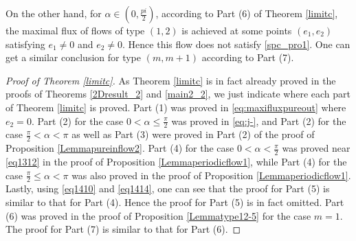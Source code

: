 \documentclass[reqno,12pt]{amsart}
\begin{document}
{
On the other hand, for $\alpha \in (0, \frac{pi}{2})$,  according to Part (6) of Theorem \ref{limitc}, the maximal flux of flows of type $(1,2)$ is achieved at some points $(e_1,e_2)$ satisfying $e_1 \not=0$ and $e_2\not =0$. Hence this flow does not satisfy \eqref{spc_pro1}. One can get a similar conclusion for type $(m,m+1)$ according to Part (7).
}

\begin{proof}[Proof of Theorem \ref{limitc}]
As Theorem \ref{limitc} is in fact already proved in the proofs of  Theorems \ref{2Dresult_2} and \ref{main2_2}, we just indicate where each part of Theorem \ref{limitc} is proved. Part (1) was proved in \eqref{eq:maxifluxpureout} where $e_2=0$.
Part (2) for the case $0<\alpha \leq \frac{\pi}{2}$ was proved in \eqref{eq:j-}, and Part (2) for the case $\frac{\pi}{2}<\alpha<\pi$ as well as Part (3) were proved in Part (2) of the proof of Proposition \ref{Lemmapureinflow2}. Part (4) for the case $0<\alpha< \frac{\pi}{2}$ was proved near \eqref{eq1312} in  the proof of Proposition \ref{Lemmaperiodicflow1}, while Part (4) for the case $\frac{\pi}{2}\leq \alpha < \pi$ was also proved in the proof of Proposition \ref{Lemmaperiodicflow1}. Lastly, using \eqref{eq1410} and \eqref{eq1414}, one can see that the proof for Part (5) is similar to that for Part (4). Hence the proof for Part (5) is in fact omitted. Part (6) was proved in the proof  of Proposition \ref{Lemmatype12-5} for the case $m=1$. The proof for  Part (7) is similar to that for Part (6).  
\end{proof}
\end{document}
